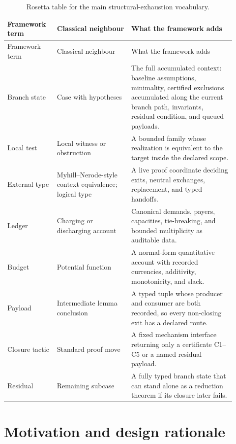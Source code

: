 \documentclass[
  11pt,
]{article}
\theoremstyle{definition}
\begin{document}
\begingroup
\small
\setlength{\tabcolsep}{2pt}
\begin{longtable}[]{@{}
  >{\raggedright\arraybackslash}p{0.20\linewidth}
  >{\raggedright\arraybackslash}p{0.30\linewidth}
  >{\raggedright\arraybackslash}p{0.42\linewidth}@{}}
\caption{Rosetta table for the main structural-exhaustion vocabulary.}
\label{tab:introduction-rosetta}\\
\toprule\noalign{}
Framework term & Classical neighbour & What the framework adds \\
\midrule\noalign{}
\endfirsthead
\toprule\noalign{}
Framework term & Classical neighbour & What the framework adds \\
\midrule\noalign{}
\endhead
\bottomrule\noalign{}
\endlastfoot
Branch state & Case with hypotheses & The full accumulated context:
baseline assumptions, minimality, certified exclusions accumulated along
the current branch path, invariants,
residual condition, and queued payloads. \\
Local test & Local witness or obstruction & A bounded family whose
realization is equivalent to the target inside the declared scope. \\
External type & Myhill--Nerode-style context equivalence; logical type & A live proof
coordinate deciding exits, neutral exchanges, replacement, and typed
handoffs. \\
Ledger & Charging or discharging account & Canonical demands, payers,
capacities, tie-breaking, and bounded multiplicity as auditable data. \\
Budget & Potential function & A normal-form quantitative account with
recorded currencies, additivity, monotonicity, and slack. \\
Payload & Intermediate lemma conclusion & A typed tuple whose producer
and consumer are both recorded, so every non-closing exit has a declared
route. \\
Closure tactic & Standard proof move & A fixed mechanism interface
returning only a certificate C1--C5 or a named residual payload. \\
Residual & Remaining subcase & A fully typed branch state that can stand
alone as a reduction theorem if its closure later fails. \\
\end{longtable}
\endgroup

\section{Motivation and design rationale}\label{motivation-and-literature-background}
\end{document}
